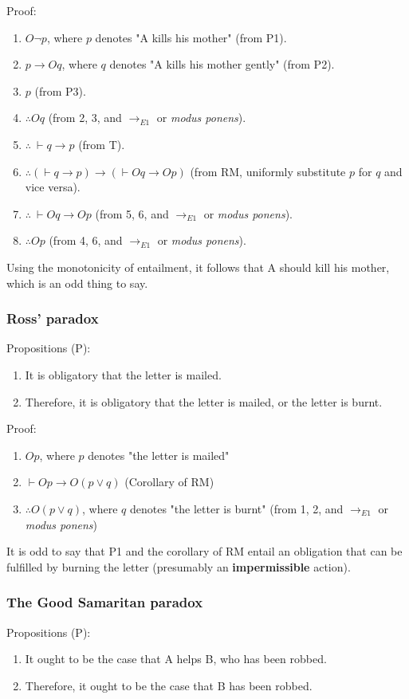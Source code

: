 \documentclass[11pt]{article}
\begin{document}
Proof:
\begin{enumerate}
\item \(O \neg p\), where \(p\) denotes "A kills his mother" (from P1).
\item \(p \rightarrow Oq\), where \(q\) denotes "A kills his mother gently" (from P2).
\item \(p\) (from P3).
\item \(\therefore Oq\) (from 2, 3, and \(\rightarrow_{E1}\) or \emph{modus ponens}).
\item \(\therefore \ \vdash q \rightarrow p\) (from T).
\item \(\therefore (\vdash q \rightarrow p) \rightarrow (\vdash Oq \rightarrow Op)\) (from RM, uniformly substitute \(p\) for \(q\) and vice versa).
\item \(\therefore \ \vdash Oq \rightarrow Op\) (from 5, 6, and \(\rightarrow_{E1}\) or \emph{modus ponens}).
\item \(\therefore Op\) (from 4, 6, and \(\rightarrow_{E1}\) or \emph{modus ponens}).
\end{enumerate}

Using the monotonicity of entailment, it follows that A should kill his mother, which is an odd thing to say.
\subsubsection{Ross' paradox}
\label{sec:orgd43340a}
Propositions (P):
\begin{enumerate}
\item It is obligatory that the letter is mailed.
\item Therefore, it is obligatory that the letter is mailed, or the letter is burnt.
\end{enumerate}

Proof:
\begin{enumerate}
\item \(Op\), where \(p\) denotes "the letter is mailed"
\item \(\vdash Op \rightarrow O(p \vee q)\) (Corollary of RM)
\item \(\therefore O(p \vee q)\), where \(q\) denotes "the letter is burnt" (from 1, 2, and \(\rightarrow_{E1}\) or \emph{modus ponens})
\end{enumerate}

It is odd to say that P1 and the corollary of RM entail an obligation that can be fulfilled by burning the letter (presumably an \textbf{impermissible} action).
\subsubsection{The Good Samaritan paradox}
\label{sec:org51ff5a1}
Propositions (P):
\begin{enumerate}
\item It ought to be the case that A helps B, who has been robbed.
\item Therefore, it ought to be the case that B has been robbed.
\end{enumerate}
\end{document}
